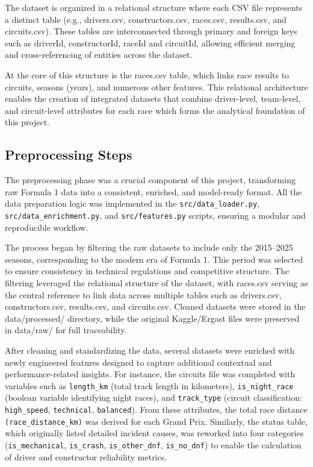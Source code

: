 \documentclass[11pt,a4paper]{article}
\begin{document}
The dataset is organized in a relational structure where each CSV file represents a distinct table (e.g., drivers.csv, constructors.csv, races.csv, results.csv, and circuits.csv). These tables are interconnected through primary and foreign keys such as driverId, constructorId, raceId and circuitId, allowing efficient merging and cross-referencing of entities across the dataset.

At the core of this structure is the races.csv table, which links race results to circuits, seasons (years), and numerous other features. This relational architecture enables the creation of integrated datasets that combine driver-level, team-level, and circuit-level attributes for each race which forms the analytical foundation of this project.

\subsection{Preprocessing Steps}
\label{subsec:preprocessing}

The preprocessing phase was a crucial component of this project, transforming raw Formula 1 data into a consistent, enriched, and model-ready format. All the data preparation logic was implemented in the \texttt{src/data\_loader.py}, \texttt{src/data\_enrichment.py}, and \texttt{src/features.py} scripts, ensuring a modular and reproducible workflow.

The process began by filtering the raw datasets to include only the 2015–2025 seasons, corresponding to the modern era of Formula 1. This period was selected to ensure consistency in technical regulations and competitive structure. The filtering leveraged the relational structure of the dataset, with races.csv serving as the central reference to link data across multiple tables such as drivers.csv, constructors.csv, results.csv, and circuits.csv. Cleaned datasets were stored in the data/processed/ directory, while the original Kaggle/Ergast files were preserved in data/raw/ for full traceability.

After cleaning and standardizing the data, several datasets were enriched with newly engineered features designed to capture additional contextual and performance-related insights. For instance, the circuits file was completed with variables such as \texttt{length\_km} (total track length in kilometers), \texttt{is\_night\_race} (boolean variable identifying night races), and \texttt{track\_type} (circuit classification: \texttt{high\_speed}, \texttt{technical}, \texttt{balanced}). From these attributes, the total race distance \texttt{(race\_distance\_km)} was derived for each Grand Prix. Similarly, the status table, which originally listed detailed incident causes, was reworked into four categories (\texttt{is\_mechanical}, \texttt{is\_crash}, \texttt{is\_other\_dnf}, \texttt{is\_no\_dnf}) to enable the calculation of driver and constructor reliability metrics.
\end{document}
